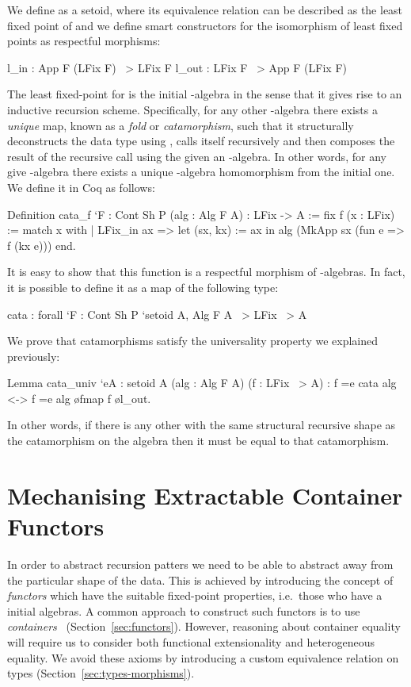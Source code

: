 \documentclass{llncs}
\begin{document}
We define  as a setoid, where its equivalence relation can be
described as the least fixed point of  and we define smart
constructors for the isomorphism of least fixed points as respectful morphisms:
\begin{coqcode}
l_in : App F (LFix F) ~> LFix F                l_out : LFix F ~> App F (LFix F)
\end{coqcode}
The least fixed-point for  is the initial -algebra in the sense
that it gives rise to an inductive recursion scheme.  Specifically, for any
other -algebra there exists a \emph{unique} map, known as a \emph{fold} or
\emph{catamorphism}, such that it structurally deconstructs the data type
using , calls itself recursively and then composes the result of
the recursive call using the given an -algebra. In other words, for any
give -algebra there exists a unique -algebra homomorphism from the
initial one. We define it in Coq as follows:
\begin{coqcode}
  Definition cata_f `{F : Cont Sh P} (alg : Alg F A) : LFix -> A
:= fix f (x : LFix) := match x with
  | LFix_in ax => let (sx, kx) := ax in alg (MkApp sx (fun e => f (kx e))) end.
\end{coqcode}
It is easy to show that this function is a respectful morphism of
-algebras. In fact, it is possible to define it as a map of the
following type:
\begin{coqcode}
  cata : forall `{F : Cont Sh P} `{setoid A}, Alg F A ~> LFix ~> A
\end{coqcode}
We prove that catamorphisms satisfy the universality property we explained previously:
\begin{coqcode}
Lemma cata_univ `{eA : setoid A} (alg : Alg F A) (f : LFix ~> A)
    : f =e cata alg <-> f =e alg \o fmap f \o l_out.
\end{coqcode}
In other words, if there is any other  with the same structural recursive
shape as the catamorphism on the algebra  then it must be equal to that
catamorphism.


\section{Mechanising Extractable Container Functors}
\label{sec:containers}
In order to abstract recursion patters we need to be able to abstract away from
the particular shape of the data.  This is achieved by introducing the concept
of \emph{functors} which have the suitable fixed-point properties, i.e.\ those
who have a initial algebras. A common approach to construct such functors is to
use \emph{containers}~\cite{AbbottAG05} (Section~\ref{sec:functors}).
However, reasoning about container equality will require us to consider both
functional extensionality and heterogeneous equality. We avoid these axioms by
introducing a custom equivalence relation on types
(Section~\ref{sec:types-morphisms}).
\end{document}
